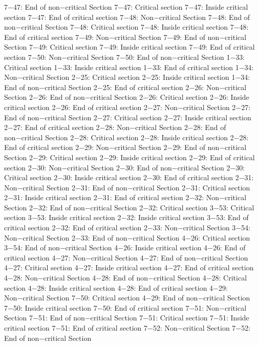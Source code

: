 7−47: End of non−critical Section
7−47: Critical section
7−47: Inside critical section
7−47: End of critical section
7−48: Non−critical Section
7−48: End of non−critical Section
7−48: Critical section
7−48: Inside critical section
7−48: End of critical section
7−49: Non−critical Section
7−49: End of non−critical Section
7−49: Critical section
7−49: Inside critical section
7−49: End of critical section
7−50: Non−critical Section
7−50: End of non−critical Section
1−33: Critical section
1−33: Inside critical section
1−33: End of critical section
1−34: Non−critical Section
2−25: Critical section
2−25: Inside critical section
1−34: End of non−critical Section
2−25: End of critical section
2−26: Non−critical Section
2−26: End of non−critical Section
2−26: Critical section
2−26: Inside critical section
2−26: End of critical section
2−27: Non−critical Section
2−27: End of non−critical Section
2−27: Critical section
2−27: Inside critical section
2−27: End of critical section
2−28: Non−critical Section
2−28: End of non−critical Section
2−28: Critical section
2−28: Inside critical section
2−28: End of critical section
2−29: Non−critical Section
2−29: End of non−critical Section
2−29: Critical section
2−29: Inside critical section
2−29: End of critical section
2−30: Non−critical Section
2−30: End of non−critical Section
2−30: Critical section
2−30: Inside critical section
2−30: End of critical section
2−31: Non−critical Section
2−31: End of non−critical Section
2−31: Critical section
2−31: Inside critical section
2−31: End of critical section
2−32: Non−critical Section
2−32: End of non−critical Section
2−32: Critical section
3−53: Critical section
3−53: Inside critical section
2−32: Inside critical section
3−53: End of critical section
2−32: End of critical section
2−33: Non−critical Section
3−54: Non−critical Section
2−33: End of non−critical Section
4−26: Critical section
3−54: End of non−critical Section
4−26: Inside critical section
4−26: End of critical section
4−27: Non−critical Section
4−27: End of non−critical Section
4−27: Critical section
4−27: Inside critical section
4−27: End of critical section
4−28: Non−critical Section
4−28: End of non−critical Section
4−28: Critical section
4−28: Inside critical section
4−28: End of critical section
4−29: Non−critical Section
7−50: Critical section
4−29: End of non−critical Section
7−50: Inside critical section
7−50: End of critical section
7−51: Non−critical Section
7−51: End of non−critical Section
7−51: Critical section
7−51: Inside critical section
7−51: End of critical section
7−52: Non−critical Section
7−52: End of non−critical Section
